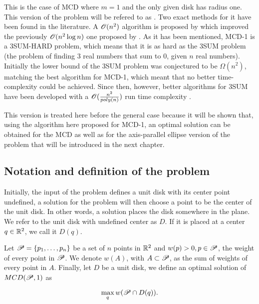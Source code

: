 This is the case of MCD where $m=1$ and the only given disk has radius one. This version of the problem will be refered to as . Two exact methods for it have been found in the literature. A $\mathscr{O}(n^2)$ algorithm is proposed by  which improved the previously $\mathscr{O}(n^2\log{n})$ one proposed by .
As it has been mentioned, MCD-1 is a 3SUM-HARD problem, which means that it is as hard as the 3SUM problem (the problem of finding $3$ real numbers that sum to $0$, given $n$ real numbers). Initially the lower bound of the 3SUM problem was conjectured to be $\Omega(n^2)$, matching the best algorithm for MCD-1, which meant that no better time-complexity could be achieved. Since then, however, better algorithms for 3SUM have been developed with a $\mathscr{O}(\frac{n^2}{poly(n)})$ run time complexity \cite{3SUM-kopelowitz:2014}.

This version is treated here before the general case because it will be shown that, using the algorithm here proposed for MCD-1, an optimal solution can be obtained for the MCD as well as for the axis-parallel ellipse version of the problem that will be introduced in the next chapter.



\subsection{Notation and definition of the problem}

Initially, the input of the problem defines a unit disk with its center point undefined, a solution for the problem will then choose a point to be the center of the unit disk. In other words, a solution places the disk somewhere in the plane.
We refer to the unit disk with undefined center as $D$. If it is placed at a center $q \in \mathbb{R}^2$, we call it $D(q)$.

\begin{definicao}
    Let $\mathscr{P}=\{p_1,\dots,p_n\}$ be a set of $n$ points in $\mathbb{R}^2$ and $w(p)>0, p \in \mathscr{P}$, the weight of every point in $\mathscr{P}$. We denote $w(A)$, with $A \subset \mathscr{P}$, as the sum of weights of every point in $A$. Finally, let $D$ be a unit disk, we define an optimal solution of $MCD(\mathscr{P},1)$ as
    
    \begin{equation}\label{eq:max_one_disk}
        \max_q w(\mathscr{P} \cap D(q)).
    \end{equation}

\end{definicao}

